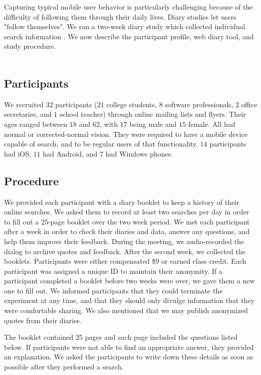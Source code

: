 Capturing typical mobile user behavior is particularly challenging because of the difficulty of following them through their daily lives. Diary studies let users "follow themselves". We ran a two-week diary study which collected individual search information \cite{Sohn:2008}. We now describe the participant profile, web diary tool, and study procedure.\\\\


\subsection{Participants}
We recruited $32$ participants ($21$ college students, $8$ software professionals, $2$ office secretaries, and $1$ school teacher) through online mailing lists and flyers. Their ages ranged between $18$ and $62$, with $17$ being male and $15$ female. All had normal or corrected-normal vision. They were required to have a mobile device capable of search, and to be regular users of that functionality. $14$ participants had iOS, $11$ had Android, and $7$ had Windows phones. 

\subsection{Procedure}
We provided each participant with a diary booklet to keep a history of their online searches.  We asked them to record at least two searches per day in order to fill out a 25-page booklet over the two week period. We met each participant after a week in order to check their diaries and data, answer any questions, and help them improve their feedback. During the meeting, we audio-recorded the dialog to archive quotes and feedback. After the second week, we collected the booklets. Participants were either compensated \$9 or earned class credit. Each participant was assigned a unique ID to maintain their anonymity. If a participant completed a booklet before two weeks were over, we gave them a new one to fill out. We informed participants that they could terminate the experiment at any time, and that they should only divulge information that they were comfortable sharing. We also mentioned that we may publish anonymized quotes from their diaries. 

The booklet contained 25 pages and each page included the questions listed below. If participants were not able to find an appropriate answer, they provided an explanation. We asked the participants to write down these details as soon as possible after they performed a search. 

